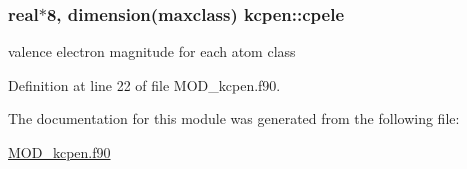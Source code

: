 \hypertarget{classkcpen_a6814a7cf39d646c28f4993dfec05556f}{
\subsubsection[{cpele}]{\setlength{\rightskip}{0pt plus 5cm}real$\ast$8, dimension(maxclass) kcpen\-::cpele}}\label{classkcpen_a6814a7cf39d646c28f4993dfec05556f}


valence electron magnitude for each atom class 



Definition at line 22 of file M\-O\-D\-\_\-kcpen.\-f90.



The documentation for this module was generated from the following file\-:\begin{DoxyCompactItemize}
\item 
\hyperlink{MOD__kcpen_8f90}{M\-O\-D\-\_\-kcpen.\-f90}\end{DoxyCompactItemize}
